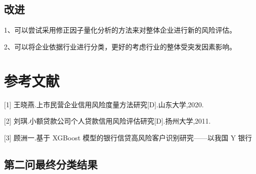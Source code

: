 \documentclass[UTF8]{ctexart}
\begin{document}
\subsection{改进}
1、可以尝试采用修正因子量化分析的方法来对整体企业进行新的风险评估。

2、可以将企业依据行业进行分类，更好的考虑行业的整体受突发因素影响。


% 

\newpage

\section{参考文献}
 [1] 王晓燕.上市民营企业信用风险度量方法研究[D].山东大学,2020.

[2] 刘琪.小额贷款公司个人贷款信用风险评估研究[D].扬州大学,2011.

[3] 顾洲一.基于 XGBoost 模型的银行信贷高风险客户识别研究——以我国 Y 银行


\newpage

\subsection{第二问最终分类结果}
\end{document}
